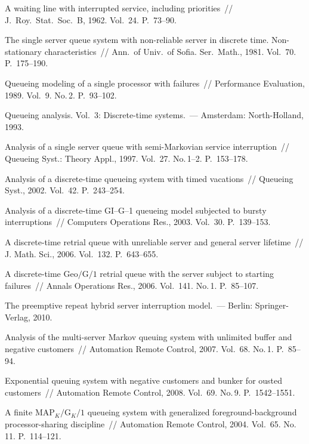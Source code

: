 \begin{multicols}{2}
{{\begin{thebibliography}{99}
 A waiting line with interrupted service,
including priorities~// J.\ Roy.\ Stat.\ Soc.~B, 1962. Vol.~24.
P.~73--90.

 The single server queue system with
non-reliable server in discrete time. Non-stationary characteristics~//
Ann.\ of Univ.\ of Sofia. Ser.\ Math., 1981. Vol.~70. P.~175--190.

 Queueing modeling of a single processor with
failures~// Performance Evaluation, 1989. Vol.~9. No.\,2. P.~93--102.

Queueing analysis. Vol.~3: Discrete-time systems.~---
Amsterdam: North-Holland, 1993.

 Analysis of a single server queue with
semi-Markovian service interruption~// Queueing Syst.: Theory Appl., 1997. Vol.~27. No.\,1--2. P.~153--178.

 Analysis of a discrete-time queueing
system with timed vacations~// Queueing Syst., 2002. Vol.~42.
P.~243--254.

 Analysis of a discrete-time
GI--G--1 queueing model subjected to bursty interruptions~//
Computers Operations Res., 2003. Vol.~30. P.~139--153.

 A discrete-time retrial queue with unreliable server
and general server lifetime~// J. Math. Sci.,
2006. Vol.~132. P.~643--655.

 A discrete-time $\mbox{Geo}/\mbox{G}/1$ retrial queue
with the server subject to starting failures~// Annals Operations
Res., 2006. Vol.~141. No.\,1. P.~85--107.

The preemptive repeat hybrid server interruption model.~---
Berlin: Springer-Verlag, 2010.


Analysis of the multi-server Markov queuing system with unlimited
buffer and negative customers~// Automation Remote Control,
2007. Vol.~68. No.\,1. P.~85--94.

 Exponential queuing
system with negative customers and bunker for ousted customers~//
Automation Remote Control, 2008. Vol.~69. No.\,9. P.~1542--1551.

\label{end\stat}

 A finite $\mbox{MAP}_K/\mbox{G}_K/1$
queueing system with generalized foreground-background
processor-sharing discipline~// Automation Remote Control, 2004.
Vol.~65. No.\,11. P.~114--121.
 \end{thebibliography}
}
}


\end{multicols}
